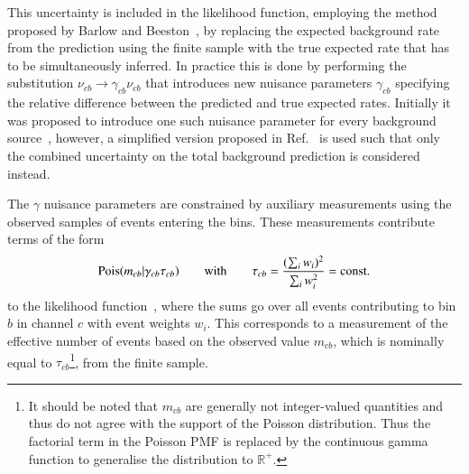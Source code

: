 This uncertainty is included in the likelihood function, employing the
method proposed by Barlow and Beeston~\cite{barlow1993}, by replacing
the expected background rate from the prediction using the finite
sample with the true expected rate that has to be simultaneously
inferred. In practice this is done by performing the substitution
$\nu_{cb} \rightarrow \gamma_{cb} \nu_{cb}$ that introduces new
nuisance parameters $\gamma_{cb}$ specifying the relative difference
between the predicted and true expected rates. Initially it was
proposed to introduce one such nuisance parameter for every background
source~\cite{barlow1993}, however, a simplified version proposed in
Ref.~\cite{conway2011} is used such that only the combined uncertainty
on the total background prediction is considered instead.

The $\gamma$ nuisance parameters are constrained by auxiliary
measurements using the observed samples of events entering the
bins. These measurements contribute terms of the form
\begin{align*}
  \operatorname{Pois}(m_{cb} | \gamma_{cb} \tau_{cb})
  \qquad \text{with} \qquad
  \tau_{cb} = \frac{( \sum_i w_i )^2}{\sum_i w_i^2} = \text{const.}
\end{align*}
to the likelihood function~\cite{cranmer2012}, where the sums go over
all events contributing to bin $b$ in channel $c$ with event weights
$w_i$. This corresponds to a measurement of the effective number of
events based on the observed value $m_{cb}$, which is nominally equal
to $\tau_{cb}$\footnote{It should be noted that $m_{cb}$ are generally
  not integer-valued quantities and thus do not agree with the support
  of the Poisson distribution. Thus the factorial term in the Poisson
  PMF is replaced by the continuous gamma function to generalise the
  distribution to $\mathbb{R}^+$.}, from the finite sample.

